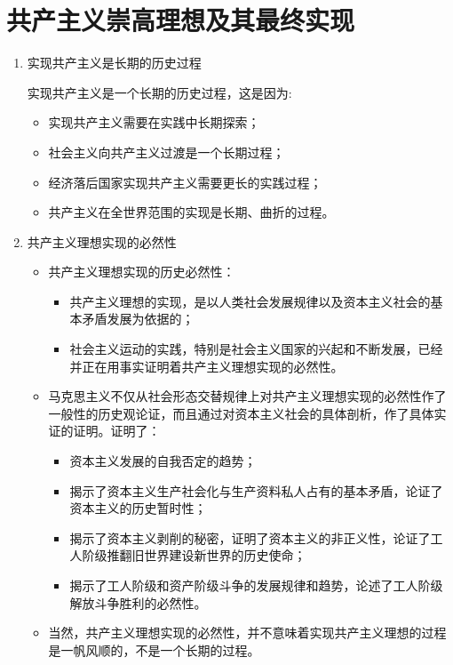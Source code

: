 \documentclass[device=pad,lang=cn,UTF8]{elegantbook}
\begin{document}
    \chapter{共产主义崇高理想及其最终实现}
    \begin{enumerate}
        \item 实现共产主义是长期的历史过程\par
        实现共产主义是一个长期的历史过程，这是因为:
        \begin{itemize}
            \item 实现共产主义需要在实践中长期探索；
            \item 社会主义向共产主义过渡是一个长期过程；
            \item 经济落后国家实现共产主义需要更长的实践过程；
            \item 共产主义在全世界范围的实现是长期、曲折的过程。
        \end{itemize}
        \item 共产主义理想实现的必然性
        \begin{itemize}
            \item 共产主义理想实现的历史必然性：
            \begin{itemize}
                \item 共产主义理想的实现，是以人类社会发展规律以及资本主义社会的基本矛盾发展为依据的；
                \item 社会主义运动的实践，特别是社会主义国家的兴起和不断发展，已经并正在用事实证明着共产主义理想实现的必然性。
            \end{itemize}
            \item 马克思主义不仅从社会形态交替规律上对共产主义理想实现的必然性作了一般性的历史观论证，而且通过对资本主义社会的具体剖析，作了具体实证的证明。证明了：
            \begin{itemize}
                \item 资本主义发展的自我否定的趋势；
                \item 揭示了资本主义生产社会化与生产资料私人占有的基本矛盾，论证了资本主义的历史暂时性；
                \item 揭示了资本主义剥削的秘密，证明了资本主义的非正义性，论证了工人阶级推翻旧世界建设新世界的历史使命；
                \item 揭示了工人阶级和资产阶级斗争的发展规律和趋势，论述了工人阶级解放斗争胜利的必然性。
            \end{itemize}
            \item 当然，共产主义理想实现的必然性，并不意味着实现共产主义理想的过程是一帆风顺的，不是一个长期的过程。
        \end{itemize}
    \end{enumerate}
\end{document}
